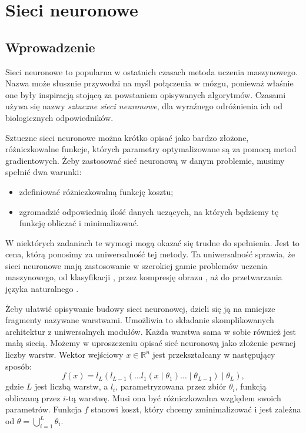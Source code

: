 
\setlength{\abovedisplayskip}{20pt}
\setlength{\belowdisplayskip}{20pt}

\chapter{Sieci neuronowe} \label{rozdzial1}

\section{Wprowadzenie}
Sieci neuronowe to popularna w ostatnich czasach metoda uczenia maszynowego. Nazwa może słusznie przywodzi na myśl połączenia w mózgu, ponieważ właśnie one były inspiracją stojącą za powstaniem opisywanych algorytmów. Czasami używa się nazwy \textit{sztuczne sieci neuronowe}, dla wyraźnego odróżnienia ich od biologicznych odpowiedników.

Sztuczne sieci neuronowe można krótko opisać jako bardzo złożone, różniczkowalne funkcje, których parametry optymalizowane są za pomocą metod gradientowych. Żeby zastosować sieć neuronową w danym problemie, musimy spełnić dwa warunki:
\begin{itemize}
\item zdefiniować różniczkowalną funkcję kosztu;
\item zgromadzić odpowiednią ilość danych uczących, na których będziemy tę funkcję obliczać i minimalizować.
\end{itemize}

W niektórych zadaniach te wymogi mogą okazać się trudne do spełnienia. Jest to cena, którą ponosimy za uniwersalność tej metody. Ta uniwersalność sprawia, że sieci neuronowe mają zastosowanie w szerokiej gamie problemów uczenia maszynowego, od klasyfikacji \cite{imagenet}, przez kompresję obrazu \cite{compression}, aż do przetwarzania języka naturalnego \cite{rnnlm}.

Żeby ułatwić opisywanie budowy sieci neuronowej, dzieli się ją na mniejsze fragmenty nazywane warstwami. Umożliwia to składanie skomplikowanych architektur z uniwersalnych modułów. Każda warstwa sama w sobie również jest małą siecią. Możemy w uproszczeniu opisać sieć neuronową jako złożenie pewnej liczby warstw. Wektor wejściowy $x \in \mathbb{R}^n$ jest przekształcany w następujący sposób:
\[f(x) = l_L(l_{L-1}(\dots l_1(x \mid \theta_1) \dots \mid \theta_{L-1}) \mid \theta_L),\]
gdzie $L$ jest liczbą warstw, a $l_i$, parametryzowana przez zbiór $\theta_i$, funkcją obliczaną przez $i$-tą warstwę. Musi ona być różniczkowalna względem swoich parametrów. Funkcja $f$ stanowi koszt, który chcemy zminimalizować i jest zależna od $\theta = \bigcup_{i=1}^L \theta_i$.


